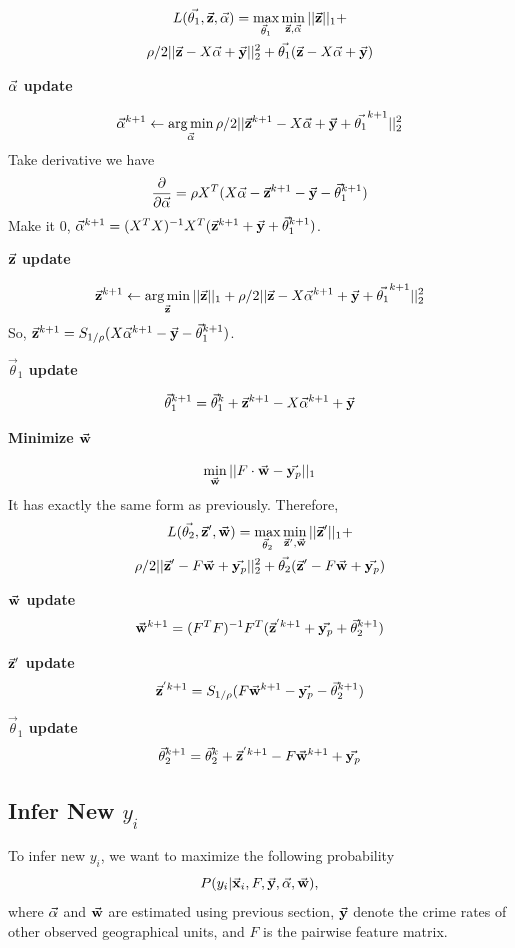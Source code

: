 \begin{multline}
L(\vec{\theta_1}, \z, \demow) = \max_{\vec\theta_1} \min_{\z, \demow} ||\z||_1 + \\
\rho/2 ||\z - X\demow + \y||_2^2  + \vec{\theta_1}( \z - X\demow + \y ) 
\end{multline}

\textbf{$\demow$ update}

\[ \demow^{k+1} \gets \argmin_{\demow}  \rho/2 ||\z^{k+1} - X\demow + \y + \vec{\theta_1}^{k+1}||_2^2 \]
Take derivative we have
\[ \frac{\partial}{\partial \demow} = \rho X^T(X\demow - \z^{k+1} - \y - \vec\theta_1^{k+1} ) \]
Make it $0$, $\demow^{k+1} = (X^TX)^{-1} X^T(\z^{k+1} + \y + \vec\theta_1^{k+1})$.

\textbf{$\z$ update}

\[ \z^{k+1} \gets \argmin_{\z}  ||\z||_1 + \rho/2 ||\z - X\demow^{k+1} + \y + \vec{\theta_1}^{k+1}||_2^2 \]
So, $\z^{k+1} = S_{1/\rho}(X\demow^{k+1} - \y - \vec\theta_1^{k+1})$.

\textbf{$\vec\theta_1$ update}

\[ \vec\theta_1^{k+1} = \vec\theta_1^{k} + \z^{k+1} - X\demow^{k+1} + \y \]



\textbf{Minimize $\w$}

\[ \min_{\w} ||F \cdot \w - \yp||_1 \]
It has exactly the same form as previously. Therefore,
\begin{multline}
L(\vec{\theta_2}, \z', \w) = \max_{\vec\theta_2} \min_{\z', \w}  ||\z'||_1 + \\
\rho/2 ||\z' - F\w + \yp||_2^2 + \vec{\theta_2}( \z' - F\w + \yp ) 
\end{multline}

\textbf{$\w$ update}
\[ \w^{k+1} = (F^TF)^{-1} F^T(\z^{'k+1} + \yp + \vec\theta_2^{k+1}) \]

\textbf{$\z'$ update}
\[ \z^{'k+1} = S_{1/\rho}(F\w^{k+1} - \yp - \vec\theta_2^{k+1}) \]

\textbf{$\vec\theta_1$ update}
\[ \vec\theta_2^{k+1} = \vec\theta_2^{k} + \z^{'k+1} - F\w^{k+1} + \yp \]



\subsection{Infer New $y_i$}

To infer new $y_i$, we want to maximize the following probability
\[ P(y_i | \x_i, F, \y, \demow, \w), \]
where $\demow$ and $\w$ are estimated using previous section, $\y$ denote the crime rates of other observed geographical units, and $F$ is the pairwise feature matrix.

